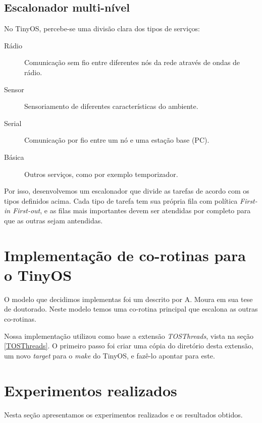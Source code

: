 \documentclass[a4paper, 10pt]{article}
\begin{document}
\subsection{Escalonador multi-nível}
No TinyOS, percebe-se uma divisão clara dos tipos de serviços: 
\begin{description}
    \item[Rádio] Comunicação sem fio entre diferentes nós da rede através de ondas de rádio.
    \item[Sensor] Sensoriamento de diferentes características do ambiente.
    \item[Serial] Comunicação por fio entre um nó e uma estação base (PC).
    \item[Básica] Outros serviços, como por exemplo temporizador.
\end{description}
Por isso, desenvolvemos um escalonador que divide as tarefas de acordo com os tipos definidos acima.
Cada tipo de tarefa tem sua própria fila com política \textit{First-in First-out}, e as filas mais importantes devem ser
atendidas por completo para que as outras sejam antendidas.


\section{Implementação de co-rotinas para o TinyOS}
O modelo que decidimos implementas foi um descrito por A. Moura em sua tese de doutorado\cite[s. 6.2]{Moura/04}.
Neste modelo temos uma co-rotina principal que escalona as outras co-rotinas.

Nossa implementação utilizou como base a extensão \textit{TOSThreads}, vista na seção \ref{TOSThreads}. O primeiro passo
foi criar uma cópia do diretório desta extensão, um novo \textit{target} para o \textit{make} do TinyOS, e fazê-lo apontar
para este. 

\section{Experimentos realizados}\label{resultados}
Nesta seção apresentamos os experimentos realizados e os resultados obtidos.
\end{document}

